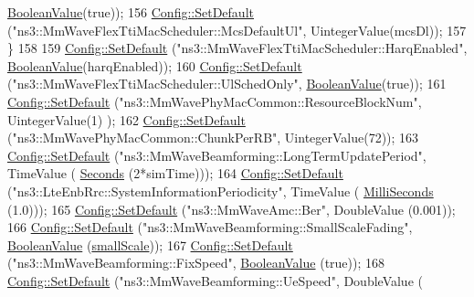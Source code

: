 \begin{DoxyCode}
      \hyperlink{classns3_1_1BooleanValue}{BooleanValue}(\textcolor{keyword}{true}));
156                 \hyperlink{group__config_ga2e7882df849d8ba4aaad31c934c40c06}{Config::SetDefault} (\textcolor{stringliteral}{"ns3::MmWaveFlexTtiMacScheduler::McsDefaultUl"}, 
      UintegerValue(mcsDl));
157         \}
158 
159         \hyperlink{group__config_ga2e7882df849d8ba4aaad31c934c40c06}{Config::SetDefault} (\textcolor{stringliteral}{"ns3::MmWaveFlexTtiMacScheduler::HarqEnabled"}, 
      \hyperlink{classns3_1_1BooleanValue}{BooleanValue}(harqEnabled));
160         \hyperlink{group__config_ga2e7882df849d8ba4aaad31c934c40c06}{Config::SetDefault} (\textcolor{stringliteral}{"ns3::MmWaveFlexTtiMacScheduler::UlSchedOnly"}, 
      \hyperlink{classns3_1_1BooleanValue}{BooleanValue}(\textcolor{keyword}{true}));
161         \hyperlink{group__config_ga2e7882df849d8ba4aaad31c934c40c06}{Config::SetDefault} (\textcolor{stringliteral}{"ns3::MmWavePhyMacCommon::ResourceBlockNum"}, UintegerValue(1)
      );
162         \hyperlink{group__config_ga2e7882df849d8ba4aaad31c934c40c06}{Config::SetDefault} (\textcolor{stringliteral}{"ns3::MmWavePhyMacCommon::ChunkPerRB"}, UintegerValue(72));
163         \hyperlink{group__config_ga2e7882df849d8ba4aaad31c934c40c06}{Config::SetDefault} (\textcolor{stringliteral}{"ns3::MmWaveBeamforming::LongTermUpdatePeriod"}, TimeValue (
      \hyperlink{group__timecivil_ga33c34b816f8ff6628e33d5c8e9713b9e}{Seconds} (2*simTime)));
164         \hyperlink{group__config_ga2e7882df849d8ba4aaad31c934c40c06}{Config::SetDefault} (\textcolor{stringliteral}{"ns3::LteEnbRrc::SystemInformationPeriodicity"}, TimeValue (
      \hyperlink{group__timecivil_gaf26127cf4571146b83a92ee18679c7a9}{MilliSeconds} (1.0)));
165         \hyperlink{group__config_ga2e7882df849d8ba4aaad31c934c40c06}{Config::SetDefault} (\textcolor{stringliteral}{"ns3::MmWaveAmc::Ber"}, DoubleValue (0.001));
166         \hyperlink{group__config_ga2e7882df849d8ba4aaad31c934c40c06}{Config::SetDefault} (\textcolor{stringliteral}{"ns3::MmWaveBeamforming::SmallScaleFading"}, 
      \hyperlink{classns3_1_1BooleanValue}{BooleanValue} (\hyperlink{mmwave-amc-test_8cc_a204169f2af2a5f81da1189ea236307c8}{smallScale}));
167         \hyperlink{group__config_ga2e7882df849d8ba4aaad31c934c40c06}{Config::SetDefault} (\textcolor{stringliteral}{"ns3::MmWaveBeamforming::FixSpeed"}, 
      \hyperlink{classns3_1_1BooleanValue}{BooleanValue} (\textcolor{keyword}{true}));
168         \hyperlink{group__config_ga2e7882df849d8ba4aaad31c934c40c06}{Config::SetDefault} (\textcolor{stringliteral}{"ns3::MmWaveBeamforming::UeSpeed"}, DoubleValue (

\end{DoxyCode}
